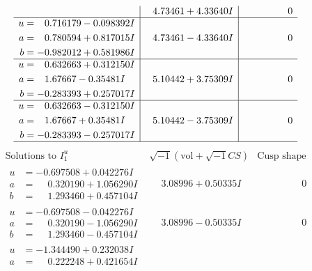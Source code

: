 \documentclass[1p]{elsarticle_modified}
\theoremstyle{definition}
\newcommand{\I}{\sqrt{-1}}
\begin{document}
$$\begin{array}{c|c|c}
 & \phantom{-}4.73461 + 4.33640 I & \phantom{-0.000000 } 0 \\ \hline\begin{aligned}
u &= \phantom{-}0.716179 - 0.098392 I \\
a &= \phantom{-}0.780594 + 0.817015 I \\
b &= -0.982012 + 0.581986 I\end{aligned}
 & \phantom{-}4.73461 - 4.33640 I & \phantom{-0.000000 } 0 \\ \hline\begin{aligned}
u &= \phantom{-}0.632663 + 0.312150 I \\
a &= \phantom{-}1.67667 - 0.35481 I \\
b &= -0.283393 + 0.257017 I\end{aligned}
 & \phantom{-}5.10442 + 3.75309 I & \phantom{-0.000000 } 0 \\ \hline\begin{aligned}
u &= \phantom{-}0.632663 - 0.312150 I \\
a &= \phantom{-}1.67667 + 0.35481 I \\
b &= -0.283393 - 0.257017 I\end{aligned}
 & \phantom{-}5.10442 - 3.75309 I & \phantom{-0.000000 } 0\\
 \hline 
 \end{array}$$\newpage$$\begin{array}{c|c|c}  
\text{Solutions to }I^u_{1}& \I (\text{vol} + \sqrt{-1}CS) & \text{Cusp shape}\\
 \hline 
\begin{aligned}
u &= -0.697508 + 0.042276 I \\
a &= \phantom{-}0.320190 + 1.056290 I \\
b &= \phantom{-}1.293460 + 0.457104 I\end{aligned}
 & \phantom{-}3.08996 + 0.50335 I & \phantom{-0.000000 } 0 \\ \hline\begin{aligned}
u &= -0.697508 - 0.042276 I \\
a &= \phantom{-}0.320190 - 1.056290 I \\
b &= \phantom{-}1.293460 - 0.457104 I\end{aligned}
 & \phantom{-}3.08996 - 0.50335 I & \phantom{-0.000000 } 0 \\ \hline\begin{aligned}
u &= -1.344490 + 0.232038 I \\
a &= \phantom{-}0.222248 + 0.421654 I \\

\end{aligned}
\end{array}$$
\end{document}
